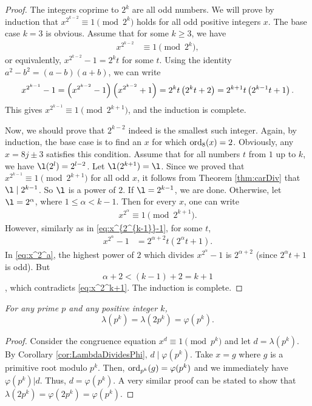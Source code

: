 \documentclass{subfile}
\begin{document}
	\begin{proof}
		The integers coprime to $2^k$ are all odd numbers. We will prove by induction that $x^{2^{k-2}} \equiv1\pmod{2^k}$ holds for all odd positive integers $x$. The base case $k=3$ is obvious. Assume that for some $k\geq 3$, we have
			\begin{align*}
				x^{2^{k-2}} & \equiv1\pmod{2^k},
			\end{align*}
		or equivalently, $x^{2^{k-2}} -1=2^kt$ for some $t$. Using the identity $a^2-b^2=(a-b)(a+b)$, we can write
			\begin{align}
				x^{2^{k-1}} -1 = \left(x^{2^{k-2}} -1\right)\left(x^{2^{k-2}} +1\right) = 2^kt\left(2^kt +2\right) = 2^{k+1}t \left(2^{k-1}t+1\right). \label{eq:x^{2^{k-1}}-1}
			\end{align}
		This gives $x^{2^{k-1}} \equiv 1\pmod{2^{k+1}}$, and the induction is complete.
		
		Now, we should prove that $2^{k-2}$ indeed is the smallest such integer. Again, by induction, the base case is to find an $x$ for which $\operatorname{ord}_8(x)=2$. Obviously, any $x=8j\pm3$ satisfies this condition. Assume that for all numbers $t$ from $1$ up to $k$, we have $\l(2^l)=2^{l-2}$. Let $\l(2^{k+1})=\l$. Since we proved that $x^{2^{k-1}} \equiv 1\pmod{2^{k+1}}$ for all odd $x$, it follows from Theorem \ref{thm:carDiv} that $\l \mid 2^{k-1}$. So $\l$ is a power of $2$. If $\l = 2^{k-1}$, we are done. Otherwise, let $\l=2^\alpha$, where $1 \leq \alpha <k-1$. Then for every $x$, one can write
			\begin{align}\label{eq:x^2^k+1}
				x^{2^\alpha} \equiv 1 \pmod{2^{k+1}}.
			\end{align}
		However, similarly as in \eqref{eq:x^{2^{k-1}}-1}, for some $t$,
			\begin{align}\label{eq:x^2^a}
				x^{2^{\alpha}} -1 &= 2^{\alpha+2}t \left(2^{\alpha}t+1\right).
			\end{align}
		In \eqref{eq:x^2^a}, the highest power of $2$ which divides $x^{2^{\alpha}} -1$ is $2^{\alpha+2}$ (since $2^{\alpha}t+1$ is odd). But $$\alpha+2 <(k-1)+2=k+1$$, which contradicts \eqref{eq:x^2^k+1}. The induction is complete.
	\end{proof}
	
	\begin{theorem}\slshape
		For any prime $p$ and any positive integer $k$, 
		\[\lambda(p^k)=\lambda(2p^k)=\varphi(p^k).\]
	\end{theorem}
	
	\begin{proof}
		Consider the congruence equation $x^d\equiv1\pmod{p^k}$ and let $d=\lambda(p^k)$. By Corollary \ref{cor:LambdaDividesPhi}, $d \mid \varphi(p^k)$. Take $x=g$ where $g$ is a primitive root modulo $p^k$. Then, $\operatorname{ord}_{p^k}(g)=\varphi(p^k)$ and we immediately have $\varphi(p^k)|d$. Thus, $d=\varphi(p^k)$. A very similar proof can be stated to show that $\lambda (2p^k)=\varphi (2p^k) = \varphi(p^k)$.
	\end{proof}
	
\end{document}
